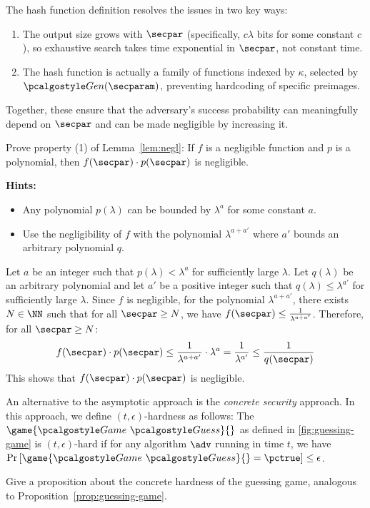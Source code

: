 \ifsolutions
\begin{mysolution}
  The hash function definition resolves the issues in two key ways:
  \begin{enumerate}
    \item The output size grows with $\secpar$ (specifically, $c\lambda$ bits for some constant $c$), so exhaustive search takes time exponential in $\secpar$, not constant time.
    \item The hash function is actually a family of functions indexed by $\kappa$, selected by $\algo{Gen}(\secparam)$, preventing hardcoding of specific preimages.
  \end{enumerate}
  Together, these ensure that the adversary's success probability can meaningfully depend on $\secpar$ and can be made negligible by increasing it.
\end{mysolution}
\fi

\begin{exercise}[Optional]\label{ex:negl-property-proof}
  Prove property (1) of Lemma~\ref{lem:negl}: If $f$ is a negligible function and $p$ is a polynomial, then $f(\secpar) \cdot p(\secpar)$ is negligible.
  
  \textbf{Hints:}
  \begin{itemize}
    \item Any polynomial $p(\lambda)$ can be bounded by $\lambda^{a}$ for some constant $a$.
    \item Use the negligibility of $f$ with the polynomial $\lambda^{a + a'}$ where $a'$ bounds an arbitrary polynomial $q$.
  \end{itemize}
\end{exercise}

\ifsolutions
\begin{mysolution}
  Let $a$ be an integer such that $p(\lambda) < \lambda^{a}$ for sufficiently large $\lambda$.
  Let $q(\lambda)$ be an arbitrary polynomial and let $a'$ be a positive integer such that $q(\lambda) \le \lambda^{a'}$ for sufficiently large $\lambda$.
  Since $f$ is negligible, for the polynomial $\lambda^{a + a'}$, there exists $N \in \NN$ such that for all $\secpar \ge N$, we have $f(\secpar) \le \frac{1}{\lambda^{a + a'}}$.
  Therefore, for all $\secpar \ge N$:
  \[
  f(\secpar) \cdot p(\secpar) \le \frac{1}{\lambda^{a + a'}} \cdot \lambda^{a} = \frac{1}{\lambda^{a'}} \le \frac{1}{q(\secpar)}
  \]
  This shows that $f(\secpar) \cdot p(\secpar)$ is negligible.
\end{mysolution}
\fi

\begin{exercise}[Optional]\label{ex:concrete-security}
  An alternative to the asymptotic approach is the \emph{concrete security} approach.
  In this approach, we define $(t,\epsilon)$-hardness as follows:
  The $\game{\Game~\algo{Guess}}{}$ as defined in \autoref{fig:guessing-game} is $(t,\epsilon)$-hard if for any algorithm $\adv$ running in time $t$, we have $\pr{\game{\Game~\algo{Guess}}{} = \pctrue} \le \epsilon$.
  
  Give a proposition about the concrete hardness of the guessing game, analogous to Proposition~\ref{prop:guessing-game}.
\end{exercise}

